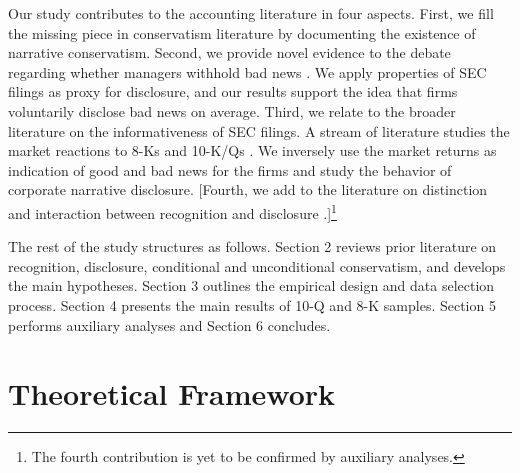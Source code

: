 \documentclass[a4paper]{article}
\begin{document}
\begin{spacing}{2}
Our study contributes to the accounting literature in four aspects. First, we fill the missing piece in conservatism literature by documenting the existence of narrative conservatism. Second, we provide novel evidence to the debate regarding whether managers withhold bad news \citep{baoManagersDiscloseWithhold2019, kothariManagersWithholdBad2009, skinnerWhyFirmsVoluntarily1994, skinnerEarningsDisclosuresStockholder1997, segalAreManagersStrategic2016}. We apply properties of SEC filings as proxy for disclosure, and our results support the idea that firms voluntarily disclose bad news on average. Third, we relate to the broader literature on the informativeness of SEC filings. A stream of literature studies the market reactions to 8-Ks \citep*{lermanNewForm8K2010, carterRelevanceForm8K1999, pinskerHasFirmsForm2006} and 10-K/Qs \citep*{alfordExtensionsViolationsStatutory1994, liAnnualReportReadability2008, liInformationContentForwardLooking2010}. We inversely use the market returns as indication of good and bad news for the firms and study the behavior of corporate narrative disclosure. [Fourth, we add to the literature on distinction and interaction between recognition and disclosure \citep*{schipperRequiredDisclosuresFinancial2007, barthMarketEffectsRecognition2003, aboodyRecognitionDisclosureOil1996}.]\footnote{The fourth contribution is yet to be confirmed by auxiliary analyses.}

The rest of the study structures as follows. Section 2 reviews prior literature on recognition, disclosure, conditional and unconditional conservatism, and develops the main hypotheses. Section 3 outlines the empirical design and data selection process. Section 4 presents the main results of 10-Q and 8-K samples. Section 5 performs auxiliary analyses and Section 6 concludes.

\section{Theoretical Framework}

\end{spacing}
\end{document}
